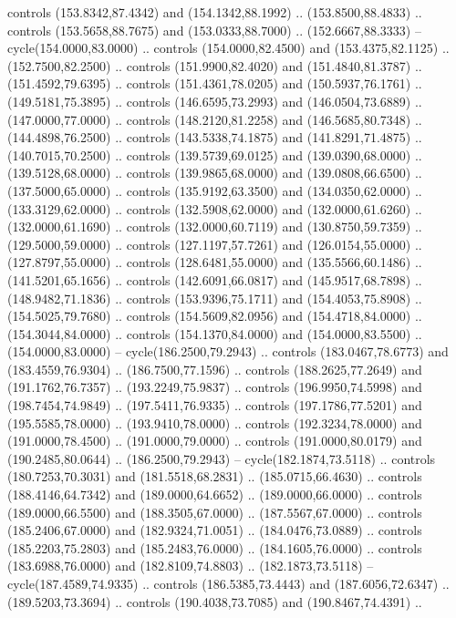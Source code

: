   controls (153.8342,87.4342) and (154.1342,88.1992) .. (153.8500,88.4833) ..
  controls (153.5658,88.7675) and (153.0333,88.7000) .. (152.6667,88.3333) --
  cycle(154.0000,83.0000) .. controls (154.0000,82.4500) and (153.4375,82.1125)
  .. (152.7500,82.2500) .. controls (151.9900,82.4020) and (151.4840,81.3787) ..
  (151.4592,79.6395) .. controls (151.4361,78.0205) and (150.5937,76.1761) ..
  (149.5181,75.3895) .. controls (146.6595,73.2993) and (146.0504,73.6889) ..
  (147.0000,77.0000) .. controls (148.2120,81.2258) and (146.5685,80.7348) ..
  (144.4898,76.2500) .. controls (143.5338,74.1875) and (141.8291,71.4875) ..
  (140.7015,70.2500) .. controls (139.5739,69.0125) and (139.0390,68.0000) ..
  (139.5128,68.0000) .. controls (139.9865,68.0000) and (139.0808,66.6500) ..
  (137.5000,65.0000) .. controls (135.9192,63.3500) and (134.0350,62.0000) ..
  (133.3129,62.0000) .. controls (132.5908,62.0000) and (132.0000,61.6260) ..
  (132.0000,61.1690) .. controls (132.0000,60.7119) and (130.8750,59.7359) ..
  (129.5000,59.0000) .. controls (127.1197,57.7261) and (126.0154,55.0000) ..
  (127.8797,55.0000) .. controls (128.6481,55.0000) and (135.5566,60.1486) ..
  (141.5201,65.1656) .. controls (142.6091,66.0817) and (145.9517,68.7898) ..
  (148.9482,71.1836) .. controls (153.9396,75.1711) and (154.4053,75.8908) ..
  (154.5025,79.7680) .. controls (154.5609,82.0956) and (154.4718,84.0000) ..
  (154.3044,84.0000) .. controls (154.1370,84.0000) and (154.0000,83.5500) ..
  (154.0000,83.0000) -- cycle(186.2500,79.2943) .. controls (183.0467,78.6773)
  and (183.4559,76.9304) .. (186.7500,77.1596) .. controls (188.2625,77.2649)
  and (191.1762,76.7357) .. (193.2249,75.9837) .. controls (196.9950,74.5998)
  and (198.7454,74.9849) .. (197.5411,76.9335) .. controls (197.1786,77.5201)
  and (195.5585,78.0000) .. (193.9410,78.0000) .. controls (192.3234,78.0000)
  and (191.0000,78.4500) .. (191.0000,79.0000) .. controls (191.0000,80.0179)
  and (190.2485,80.0644) .. (186.2500,79.2943) -- cycle(182.1874,73.5118) ..
  controls (180.7253,70.3031) and (181.5518,68.2831) .. (185.0715,66.4630) ..
  controls (188.4146,64.7342) and (189.0000,64.6652) .. (189.0000,66.0000) ..
  controls (189.0000,66.5500) and (188.3505,67.0000) .. (187.5567,67.0000) ..
  controls (185.2406,67.0000) and (182.9324,71.0051) .. (184.0476,73.0889) ..
  controls (185.2203,75.2803) and (185.2483,76.0000) .. (184.1605,76.0000) ..
  controls (183.6988,76.0000) and (182.8109,74.8803) .. (182.1873,73.5118) --
  cycle(187.4589,74.9335) .. controls (186.5385,73.4443) and (187.6056,72.6347)
  .. (189.5203,73.3694) .. controls (190.4038,73.7085) and (190.8467,74.4391) ..

